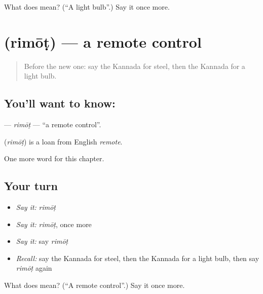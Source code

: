 \begin{tcolorbox}[breakable,colback=teal!4,colframe=teal!35!black,title={Before you move on}]
What does  mean? (\textquotedblleft{}A light bulb\textquotedblright{}.) Say it once more.
\end{tcolorbox}
\section[\texorpdfstring{\kn{ರಿಮೋಟ್} (rimōṭ)}{ರಿಮೋಟ್ (rimōṭ)}]{ (rimōṭ) — a remote control}

\label{lesson:KA-C266-rimot}



\begin{quote}
Before the new one: say the Kannada for steel, then the Kannada for a light bulb.
\end{quote}

\subsection*{You'll want to know: }
\textbf{} — \emph{rimōṭ} — \textquotedblleft{}a remote control\textquotedblright{}.

\begin{cousinweb}
\textbf{} (\emph{rimōṭ}) is a loan from English \emph{remote}.
\end{cousinweb}

\begin{grammarlens}[title={What you've built}]
One more word for this chapter.
\end{grammarlens}

\subsection*{Your turn}
\begin{itemize}
\raggedright
  \item \emph{Say it:} \emph{rimōṭ}
  \item \emph{Say it:} \emph{rimōṭ}, once more
  \item \emph{Say it:} say \emph{rimōṭ}
  \item \emph{Recall:} say the Kannada for steel, then the Kannada for a light bulb, then say \emph{rimōṭ} again
\end{itemize}

\begin{tcolorbox}[breakable,colback=teal!4,colframe=teal!35!black,title={Before you move on}]
What does  mean? (\textquotedblleft{}A remote control\textquotedblright{}.) Say it once more.
\end{tcolorbox}
